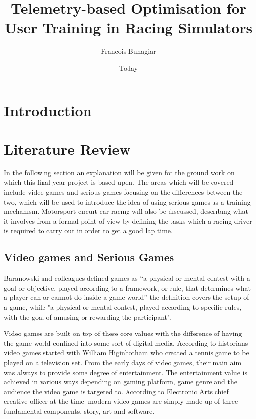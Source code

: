 \documentclass{article}
\title{Telemetry-based Optimisation for User Training in Racing Simulators}
\date{Today}
\author{Francois Buhagiar}
\begin{document}
\maketitle
{}
\newpage
{}

\newpage
\section{Introduction}

\newpage
\section{Literature Review}

In the following section an explanation will be given for the ground work on which this final year project is based upon. The areas which will be covered include video games and serious games focusing on the differences between the two, which will be used to introduce the idea of using serious games as a training mechanism. Motorsport circuit car racing will also be discussed, describing what it involves from a formal point of view by defining the tasks which a racing driver is required to carry out in order to get a good lap time. 

\subsection{Video games and Serious Games}

Baranowski and colleagues defined games as “a physical or mental contest with a goal or objective, played according to a framework, or rule, that determines what a player can or cannot do inside a game world” the definition covers the setup of a game, while  "a physical or mental contest, played according to specific rules, with the goal of amusing or rewarding the participant"\cite{yuserious}.

Video games are built on top of these core values with the difference of having the game world confined into some sort of digital media. According to historians video games started with William Higinbotham who created a tennis game to be played on a television set\cite{stanton2015brief}. From the early days of video games, their main aim was always to provide some degree of entertainment. The entertainment value is achieved in various ways depending on gaming platform, game genre and the audience the video game is targeted to. According to Electronic Arts chief creative officer at the time, modern video games are simply made up of three fundamental components, story, art and software\cite{zyda2005visual}.
\end{document}
